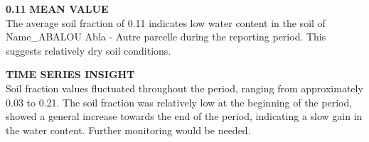 \documentclass[12pt,a4paper]{article}
\begin{document}
\vspace{0.5cm}

\parbox{\textwidth}{ %
    \begin{minipage}[t]{0.48\textwidth}
        \vspace{0.3cm}
        \textbf{\Large{0.11}}
        \vspace{0.3cm}
        \textbf{MEAN VALUE}\\
        The average soil fraction of 0.11 indicates low water content in the soil of Name\_ABALOU Abla - Autre parcelle during the reporting period. This suggests relatively dry soil conditions.
        \vspace{0.5cm}

        \textbf{TIME SERIES INSIGHT}\\
        Soil fraction values fluctuated throughout the period, ranging from approximately 0.03 to 0.21. The soil fraction was relatively low at the beginning of the period, showed a general increase towards the end of the period, indicating a slow gain in the water content. Further monitoring would be needed.
    \end{minipage}\hfill
    \begin{minipage}[t]{0.48\textwidth}
        \begin{center}
\end{center}
\end{minipage}}
\end{document}
